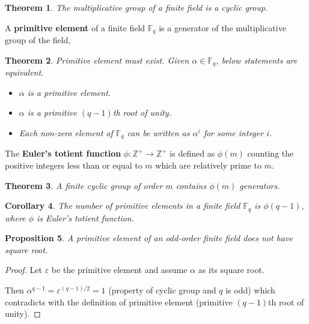 \documentclass[12pt, letterpaper]{article}
\newcommand{\inte}{\mathbb{Z}}
\newcommand{\field}{\mathbb{F}}
\newtheorem{prop}{Proposition}[section]
\newtheorem{cor}[prop]{Corollary}
\newtheorem{thm}[prop]{Theorem}
\theoremstyle{definition}
\theoremstyle{remark}
\theoremstyle{definition}
\theoremstyle{plain}
\numberwithin{equation}{section}
\begin{document}
	\begin{thm}\label{thmGF*Cyclic}
		The multiplicative group of a finite field is a cyclic group.
	\end{thm}
	\begin{def*}
		A \textbf{primitive element} of a finite field $\field_q$ is a generator of the multiplicative group of the field,
	\end{def*}
	\begin{thm}
		Primitive element must exist.
		Given $\alpha \in \field_q$, below statements are equivalent.
		\begin{itemize}
			\item $\alpha$ is a primitive element.
			\item $\alpha$ is a primitive $(q - 1)$th root of unity.
			\item Each non-zero element of $\field_q$ can be written as $\alpha^i$ for some integer $i$.
		\end{itemize}
	\end{thm}
	
	\begin{def*}
		The \textbf{Euler's totient function} $\phi\colon\inte^+\to\inte^+$
		is defined as $\phi(m)$
		counting the positive integers less than or equal to $m$
		which are relatively prime to $m$.
	\end{def*}
	\begin{thm}
		A finite cyclic group of order $m$ contains $\phi(m)$ generators.
	\end{thm}
	\begin{cor}
		The number of primitive elements in a finite field $\field_q$ is $\phi(q - 1)$,
		where $\phi$ is Euler's totient function.
	\end{cor}
%	
	\begin{prop}\label{propPrimNoSqrt}
		A primitive element of an odd-order finite field does not have square root.
	\end{prop}
	\begin{proof}
		Let $\varepsilon$ be the primitive element and assume $\alpha$
		as its square root.
		
		Then $\alpha^{q-1}=\varepsilon^{(q-1)/2}=1$ (property of cyclic group and $q$ is odd)
		which contradicts with the definition of primitive element (primitive $(q-1)$th root of unity).
	\end{proof}
\end{document}
